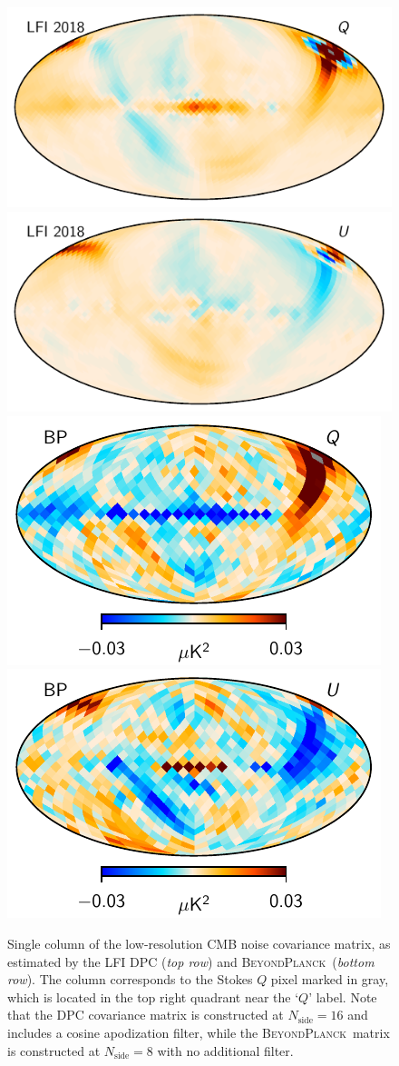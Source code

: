 \documentclass[twocolumn]{aa}
\newcommand{\BP}{\textsc{BeyondPlanck}}
\begin{document}
\begin{figure}[t]
  \center
  \includegraphics[width=0.49\linewidth]{figs/ncov_dpc_pix100_Q.pdf}
  \includegraphics[width=0.49\linewidth]{figs/ncov_dpc_pix100_U.pdf}\\
  \includegraphics[width=0.49\linewidth]{figs/ncov_pix100_BP10_Q.pdf}
  \includegraphics[width=0.49\linewidth]{figs/ncov_pix100_BP10_U.pdf}\\
  \caption{Single column of the low-resolution CMB noise covariance
    matrix, as estimated by the LFI DPC (\emph{top row}) and
    \BP\ (\emph{bottom row}). The column corresponds to the Stokes $Q$
    pixel marked in gray, which is located in the top right quadrant
    near the `$Q$' label. Note that the DPC covariance matrix is
    constructed at $N_{\mathrm{side}}=16$ and includes a cosine
    apodization filter, while the \BP\ matrix is constructed at
    $N_{\mathrm{side}}=8$ with no additional filter. }\label{fig:ncov}
\end{figure}
\end{document}
